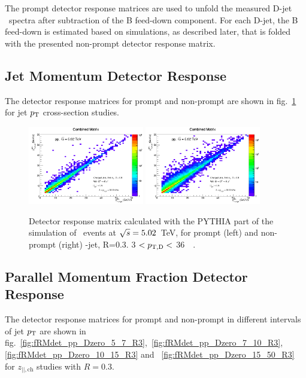 The prompt detector response matrices are used to unfold the measured D-jet \pt\ spectra after subtraction of the B feed-down component. 
For each D-jet, the B feed-down is estimated based on simulations, as described later, that is folded with the presented non-prompt detector response matrix.

\subsection{Jet Momentum Detector Response}
The detector response matrices for prompt and non-prompt are shown in fig.~\ref{fig:fRMdet_pPb_Dzero} for jet $p_{\text T}$ cross-section studies.

\begin{figure}[bth]
\centering
\includegraphics[width=0.45\textwidth]{pPbcuts_2sig/ProdMatrix}
\includegraphics[width=0.45\textwidth]{pPbcuts_2sig/ProdMatrixFD}
\caption{Detector response matrix calculated with the PYTHIA part of the simulation of \pp\ events at $\sqrt{s}=5.02$~TeV, for prompt (left) and non-prompt (right) \Dzero-jet, R=0.3. 3 $< p_{\mathrm{T,D}} < $ 36~\GeVc\ .}
\label{fig:fRMdet_pPb_Dzero}
\end{figure}


\subsection{Parallel Momentum Fraction Detector Response}
The detector response matrices for prompt and non-prompt in different intervals of jet $p_{\text T}$ are shown in 
fig.~\ref{fig:fRMdet_pp_Dzero_5_7_R3},~\ref{fig:fRMdet_pp_Dzero_7_10_R3},~
\ref{fig:fRMdet_pp_Dzero_10_15_R3} and ~\ref{fig:fRMdet_pp_Dzero_15_50_R3} for $z_{||,\text{ch}}$ studies with $R=0.3$. 


